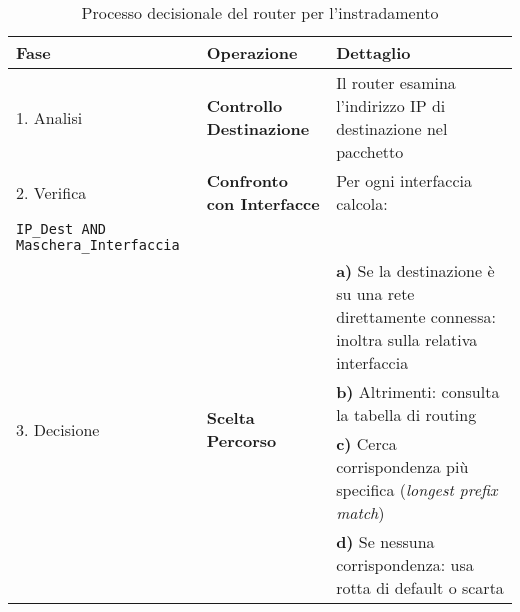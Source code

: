 \begin{table}[h]
    \centering
    \begin{tabular}{|p{2.5cm}|p{5cm}|p{6cm}|}
    \hline
    \rowcolor{bg_custom}
    \textbf{Fase} & \textbf{Operazione} & \textbf{Dettaglio} \\
    \hline
    1. Analisi & \textbf{Controllo Destinazione} & Il router esamina l'indirizzo IP di destinazione nel pacchetto \\
    \hline
    2. Verifica & \textbf{Confronto con Interfacce} & Per ogni interfaccia calcola:\\
    \texttt{IP\_Dest AND Maschera\_Interfaccia} & \\
    \hline
    \multirow{4}{*}{3. Decisione} & \multirow{4}{*}{\textbf{Scelta Percorso}} & \textbf{a)} Se la destinazione è su una rete direttamente connessa: inoltra sulla relativa interfaccia \\
    \cline{3-3}
    & & \textbf{b)} Altrimenti: consulta la tabella di routing \\
    \cline{3-3}
    & & \textbf{c)} Cerca corrispondenza più specifica (\textit{longest prefix match}) \\
    \cline{3-3}
    & & \textbf{d)} Se nessuna corrispondenza: usa rotta di default o scarta \\
    \hline
    \end{tabular}
    \caption{Processo decisionale del router per l'instradamento}
\end{table}

